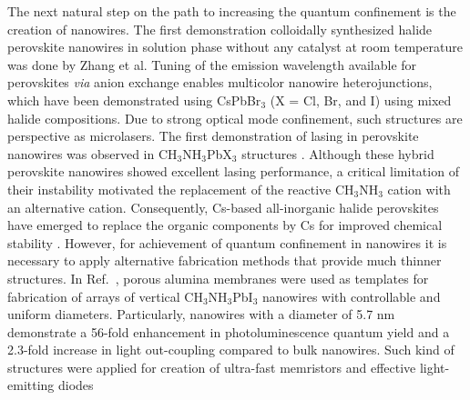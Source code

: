 \documentclass[journal=chreay,manuscript=review]{achemso}
\begin{document}
The next natural step on the path to increasing the quantum confinement is the creation of nanowires. The first demonstration colloidally synthesized halide perovskite nanowires in solution phase without any catalyst at room
temperature was done by Zhang et al.\cite{zhang2015solution} Tuning of the emission wavelength available for perovskites \textit{via} anion exchange  enables multicolor nanowire heterojunctions, which have been demonstrated using CsPbBr$_3$ (X = Cl, Br, and I) using mixed halide compositions\cite{dou2017spatially}. Due to strong optical mode confinement, such structures are perspective as microlasers. The first demonstration of lasing in perovskite nanowires was observed in CH$_3$NH$_3$PbX$_3$ structures \cite{zhu2015lead}. Although these hybrid perovskite nanowires showed excellent lasing performance, a critical limitation of their instability motivated the replacement of the reactive CH$_3$NH$_3$ cation with an alternative cation. Consequently, Cs-based all-inorganic halide perovskites have emerged to replace the organic components  by Cs for improved chemical stability \cite{pushkarev2018few,eaton2016lasing}.
However, for achievement of quantum confinement in nanowires it is necessary to apply alternative fabrication methods that provide much thinner structures. In Ref.~, porous alumina membranes were used as templates  for fabrication of arrays of  vertical CH$_3$NH$_3$PbI$_3$ nanowires with controllable and uniform diameters. Particularly, nanowires with a diameter of 5.7 nm demonstrate a 56-fold enhancement in photoluminescence quantum yield and a 2.3-fold increase in light out-coupling compared to bulk nanowires. Such kind of structures were applied for creation of ultra-fast memristors \cite{poddar2021down} and effective light-emitting diodes\cite{zhang2020three}

\end{document}
